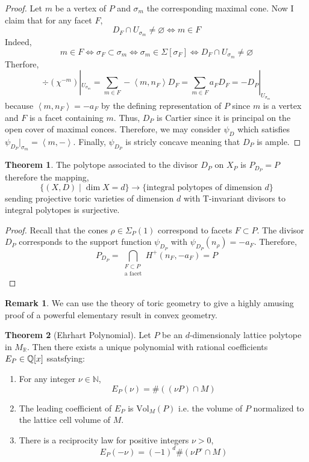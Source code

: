 \documentclass[12pt]{extarticle}
\newcommand{\R}{\mathbb{R}}
\newcommand{\N}{\mathbb{N}}
\theoremstyle{definition}
\newtheorem{theorem}{Theorem}[section]
\newtheorem{remark}{Remark}
\newcommand{\Vol}[2]{\mathrm{Vol}_{#1}\left( #2 \right)}
\newcommand{\inner}[2]{\left< #1, #2 \right>}
\begin{document}
\begin{proof}
Let $m$ be a vertex of $P$ and $\sigma_m$ the corresponding maximal cone. Now I claim that for any facet $F$,
\[ D_F \cap U_{\sigma_m} \neq \varnothing \iff m \in F \]
Indeed,
\[ m \in F \iff \sigma_F \subset \sigma_m \iff \sigma_m \in \Sigma[\sigma_F] \iff D_F \cap U_{\sigma_m} \neq \varnothing \]
Therfore,
\[ \div{(\chi^{-m})} |_{U_{\sigma_m}} = \sum_{m \in F} - \inner{m}{n_F} D_F = \sum_{m \in F} a_F D_F  = - D_P |_{U_{\sigma_m}} \]
because $\inner{m}{n_F} = - a_F$ by the defining representation of $P$ since $m$ is a vertex and $F$ is a facet containing $m$.
Thus, $D_P$ is Cartier since it is principal on the open cover of maximal conces. Therefore, we may consider $\psi_D$ which satisfies $\psi_{D_P} |_{\sigma_m} = \inner{m}{-}$. Finally, $\psi_{D_P}$ is stricly concave meaning that $D_P$ is ample. 
\end{proof}

\begin{theorem}
The polytope associated to the divisor $D_P$ on $X_P$ is $P_{D_P} = P$ therefore the mapping,
\[ \{ (X, D) \mid \dim{X} = d \} \to \{ \text{integral polytopes of dimension } d \} \]
sending projective toric varieties of dimension $d$ with T-invariant divisors to integral polytopes is surjective. 
\end{theorem}

\begin{proof}
Recall that the cones $\rho \in \Sigma_P(1)$ correspond to facets $F \subset P$. 
The divisor $D_P$ corresponds to the support function $\psi_{D_P}$ with $\psi_{D_P}(n_\rho) = - a_F$. Therefore,
\[ P_{D_P} = \bigcap_{\substack{F \subset P \\ \text{a facet}}} H^+(n_F, - a_F) = P \]
\end{proof}

\begin{remark}
We can use the theory of toric geometry to give a highly amusing proof of a powerful elementary result in convex geometry.
\end{remark}

\begin{theorem}[Ehrhart Polynomial]
Let $P$ be an $d$-dimensionaly lattice polytope in $M_\R$. Then there exists a unique polynomial with rational coefficients $E_P \in \mathbb{Q}[x]$ ssatsfying:
\begin{enumerate}
\item For any integer $\nu \in \N$,
\[ E_P(\nu) = \# \left( (\nu P) \cap M \right) \]
\item The leading coefficient of $E_P$ is $\Vol{M}{P}$ i.e. the volume of $P$ normalized to the lattice cell volume of $M$.
\item There is a reciprocity law for positive integers $\nu > 0$,
\[ E_P(-\nu) = (-1)^d \# \left( \nu P^\circ \cap M \right) \] 
\end{enumerate} 
\end{theorem}
\end{document}
